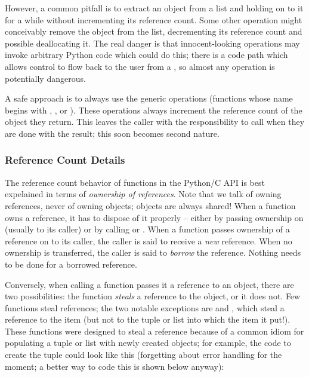 \documentclass[twoside]{report}
\begin{document}
However, a common pitfall is to extract an object from a list and 
holding on to it for a while without incrementing its reference count.  
Some other operation might conceivably remove the object from the 
list, decrementing its reference count and possible deallocating it.  
The real danger is that innocent-looking operations may invoke 
arbitrary Python code which could do this; there is a code path which 
allows control to flow back to the user from a , so 
almost any operation is potentially dangerous.

A safe approach is to always use the generic operations (functions 
whose name begins with , , 
 or ).  These operations always 
increment the reference count of the object they return.  This leaves 
the caller with the responsibility to call  when 
they are done with the result; this soon becomes second nature.

\subsubsection{Reference Count Details}

The reference count behavior of functions in the Python/C API is best 
expelained in terms of \emph{ownership of references}.  Note that we 
talk of owning references, never of owning objects; objects are always 
shared!  When a function owns a reference, it has to dispose of it 
properly -- either by passing ownership on (usually to its caller) or 
by calling  or .  When a function 
passes ownership of a reference on to its caller, the caller is said 
to receive a \emph{new} reference.  When no ownership is transferred, 
the caller is said to \emph{borrow} the reference.  Nothing needs to 
be done for a borrowed reference.

Conversely, when calling a function passes it a reference to an 
object, there are two possibilities: the function \emph{steals} a 
reference to the object, or it does not.  Few functions steal 
references; the two notable exceptions are  and 
, which steal a reference to the item (but not to 
the tuple or list into which the item it put!).  These functions were
designed to steal a reference because of a common idiom for populating
a tuple or list with newly created objects; for example, the code to
create the tuple  could look like this
(forgetting about error handling for the moment; a better way to code
this is shown below anyway):
\end{document}
